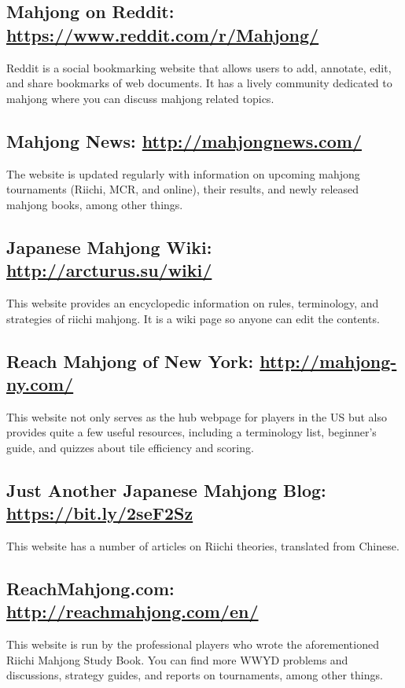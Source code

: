 \subsection*{Mahjong on Reddit: \url{https://www.reddit.com/r/Mahjong/}}
Reddit is a social bookmarking website that allows users to add, annotate, edit, and share bookmarks of web documents. It has a lively community dedicated to mahjong where you can discuss mahjong related topics. 

\subsection*{Mahjong News: \url{http://mahjongnews.com/}}
The website is updated regularly with information on upcoming \linebreak mahjong tournaments (Riichi, MCR, and online), their results, and newly released mahjong books, among other things. 

\subsection*{Japanese Mahjong Wiki: \url{http://arcturus.su/wiki/}}
This website provides an encyclopedic information on rules, terminology, and strategies of riichi mahjong. It is a wiki page so anyone can edit the contents. 

\subsection*{Reach Mahjong of New York: \url{http://mahjong-ny.com/}}
This website not only serves as the hub webpage for players in the US but also provides quite a few useful resources, including a terminology list, beginner's guide, and quizzes about tile efficiency and scoring.

\subsection*{Just Another Japanese Mahjong Blog: \url{https://bit.ly/2seF2Sz}}
This website has a number of articles on Riichi theories, translated from Chinese. 

\subsection*{ReachMahjong.com: \url{http://reachmahjong.com/en/}}
This website is run by the professional players who wrote the aforementioned Riichi Mahjong Study Book. You can find more WWYD problems and discussions, strategy guides, and reports on tournaments, \linebreak among other things. 

